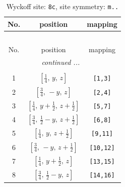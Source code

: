 \documentclass[fleqn,8pt]{jsarticle}
\begin{document}
\begin{longtable}{ccc}
\caption{Wyckoff site: {\tt 8c}, site symmetry: {\tt m..}}
 \\
 \hline \hline
No. & position & mapping \\ \hline \endfirsthead

\multicolumn{2}{l}{\tablename\ \thetable{}} \\
 \hline \hline
No. & position & mapping \\ \hline \endhead

 \hline \hline
\multicolumn{2}{r}{\footnotesize\it continued ...} \\ \endfoot

 \hline \hline
\multicolumn{2}{r}{} \\ \endlastfoot

1 & $\left[ \frac{1}{4},\, y,\, z \right]$ & {\tt [1,3]} \\ \hline
2 & $\left[ \frac{3}{4},\, - y,\, z \right]$ & {\tt [2,4]} \\ \hline
3 & $\left[ \frac{1}{4},\, y + \frac{1}{2},\, z + \frac{1}{2} \right]$ & {\tt [5,7]} \\ \hline
4 & $\left[ \frac{3}{4},\, \frac{1}{2} - y,\, z + \frac{1}{2} \right]$ & {\tt [6,8]} \\ \hline
5 & $\left[ \frac{1}{4},\, y,\, z + \frac{1}{2} \right]$ & {\tt [9,11]} \\ \hline
6 & $\left[ \frac{3}{4},\, - y,\, z + \frac{1}{2} \right]$ & {\tt [10,12]} \\ \hline
7 & $\left[ \frac{1}{4},\, y + \frac{1}{2},\, z \right]$ & {\tt [13,15]} \\ \hline
8 & $\left[ \frac{3}{4},\, \frac{1}{2} - y,\, z \right]$ & {\tt [14,16]} \\
\end{longtable}
\renewcommand{\arraystretch}{1.2}
\end{document}

